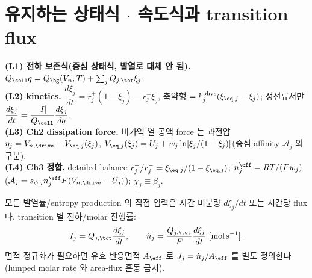 \section{유지하는 상태식 $\cdot$ 속도식과 transition flux}\label{sec:ch4_inherit}
\begin{linkbox}
\textbf{(L1) 전하 보존식(중심 상태식, 발열로 대체 안 됨).} $Q_\cell q=Q_\bg(V_n,T)+\sum_j Q_{j,\tot}\xi_j$.\\
\textbf{(L2) kinetics.} $\dfrac{d\xi_j}{dt}=r_j^+(1-\xi_j)-r_j^-\xi_j$, 축약형 $=k_j^{\mathrm{phys}}(\xi_{\eq,j}-\xi_j)$;
정전류서만 $\dfrac{d\xi_j}{dt}=\dfrac{|I|}{Q_\cell}\dfrac{d\xi_j}{dq}$.\\
\textbf{(L3) Ch2 dissipation force.} 비가역 열 공액 force 는 과전압 $\eta_j=V_{n,\drive}-V_{\eq,j}(\xi_j)$,
$V_{\eq,j}(\xi_j)=U_j+w_j\ln[\xi_j/(1-\xi_j)]$(중심 affinity $\mathcal A_j$ 와 구분).\\
\textbf{(L4) Ch3 정합.} detailed balance $r_j^+/r_j^-=\xi_{\eq,j}/(1-\xi_{\eq,j})$; $n_j^{\eff}=RT/(Fw_j)$
($\mathcal A_j=s_{\phi,j}n_j^{\eff}F(V_{n,\drive}-U_j)$); $\chi_j\equiv\beta_j$.
\end{linkbox}
모든 발열률/entropy production 의 직접 입력은 시간 미분량 $d\xi_j/dt$ 또는 시간당 flux 다. transition 별
전하/molar 진행률:
\begin{equation}
I_j=Q_{j,\tot}\frac{d\xi_j}{dt},\qquad \dot n_j=\frac{Q_{j,\tot}}{F}\frac{d\xi_j}{dt}\ [\mathrm{mol\,s^{-1}}].
\label{eq:ch4_Ij}
\end{equation}
면적 정규화가 필요하면 유효 반응면적 $A_{\eff}$ 로 $J_j=\dot n_j/A_{\eff}$ 를 별도 정의한다(lumped molar
rate 와 area-flux 혼동 금지).

